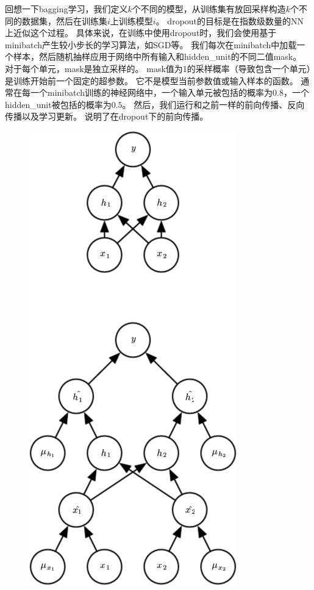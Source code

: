 
回想一下\gls{bagging}学习，我们定义$k$个不同的模型，从训练集有放回采样构造$k$个不同的数据集，然后在训练集$i$上训练模型$i$。
\gls{dropout}的目标是在指数级数量的\gls{NN}上近似这个过程。
具体来说，在训练中使用\gls{dropout}时，我们会使用基于\gls{minibatch}产生较小步长的学习算法，如\gls{SGD}等。
我们每次在\gls{minibatch}中加载一个样本，然后随机抽样应用于网络中所有输入和\gls{hidden_unit}的不同二值\gls{mask}。
对于每个单元，\gls{mask}是独立采样的。
\gls{mask}值为1的采样概率（导致包含一个单元）是训练开始前一个固定的超参数。
它不是模型当前参数值或输入样本的函数。
通常在每一个\gls{minibatch}训练的神经网络中，一个输入单元被包括的概率为$0.8$，一个\gls{hidden_unit}被包括的概率为$0.5$。
然后，我们运行和之前一样的前向传播、反向传播以及学习更新。
说明了在\gls{dropout}下的前向传播。
\begin{figure}[!htb]
\ifOpenSource
\centerline{\includegraphics[scale=0.5]{images/60.png}}

\end{figure}
